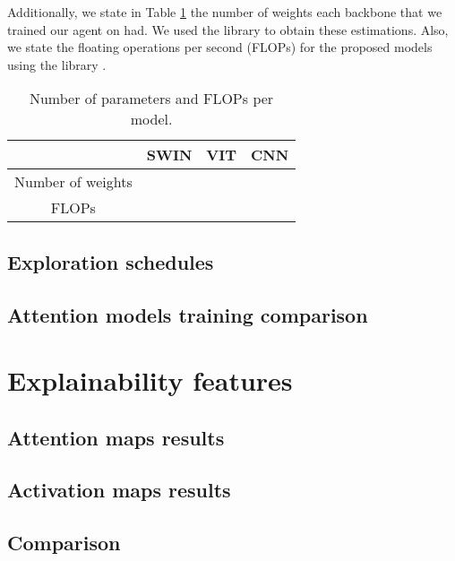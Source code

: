 Additionally, we state in Table \ref{tab:models_parameters} the number of weights each backbone that we trained our agent on had. We used the  \cite{torchinfo} library to obtain these estimations. Also, we state the floating operations per second (FLOPs) for the proposed models using the  library \cite{ptflops}.

\begin{table}[!h]
	\begin{center}
		\caption[Sample table (short title)]{Number of parameters and FLOPs per model.}
		\label{tab:models_parameters}
		\begin{tabular}{||c | c | c | c||} 
			\hline
			 & SWIN & VIT  & CNN\\
			\hline
			Number of weights &   &   &\\
			\hline
			FLOPs &   &   &\\
			\hline
		\end{tabular}
	\end{center}
\end{table}

\subsection{Exploration schedules}
\label{sec:eval_exp_schedules}

\subsection{Attention models training comparison}
\label{sec:eval_comp_models}

\section{Explainability features}
\label{sec:eval_feat_explainability}

\subsection{Attention maps results}
\label{sec:eval_attn_maps_explainability}

\subsection{Activation maps results}
\label{sec:eval_actv_explainability}

\subsection{Comparison}
\label{sec:eval_comparison}

